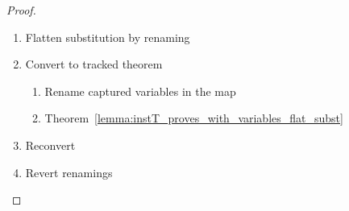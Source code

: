 \begin{frame}
    \begin{theorem}
    \end{theorem}
    \begin{corollary}
        \begin{isabelle}
        \end{isabelle}
    \end{corollary}
    \begin{proof}
        \begin{enumerate}
            \item Flatten substitution by renaming
            \item Convert to tracked theorem
            \begin{enumerate}
                \item Rename captured variables in the map
                \item Theorem~\ref{lemma:instT_proves_with_variables_flat_subst}
            \end{enumerate}
            \item Reconvert
            \item Revert renamings
        \end{enumerate}
    \end{proof}
\end{frame}